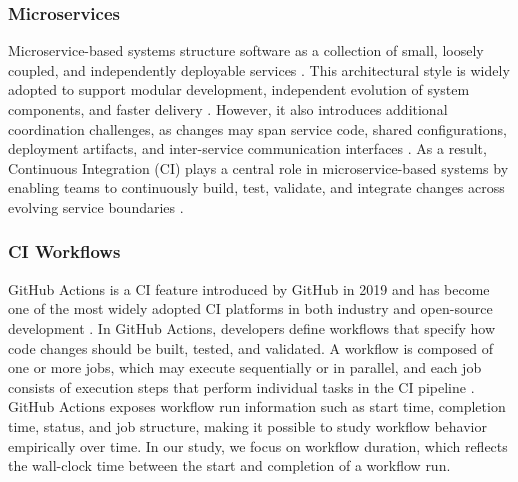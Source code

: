 \documentclass[conference]{IEEEconf}
\begin{document}
\subsubsection{Microservices}
Microservice-based systems structure software as a collection of small, loosely coupled, and independently deployable services \cite{newman2021building,fowler2014microservices}. This architectural style is widely adopted to support modular development, independent evolution of system components, and faster delivery \cite{taibi2019continuous,karabey2021deployment}. However, it also introduces additional coordination challenges, as changes may span service code, shared configurations, deployment artifacts, and inter-service communication interfaces \cite{newman2021building,karabey2021deployment}. As a result, Continuous Integration (CI) plays a central role in microservice-based systems by enabling teams to continuously build, test, validate, and integrate changes across evolving service boundaries \cite{taibi2019continuous}.

\subsubsection{CI Workflows}
GitHub Actions is a CI feature introduced by GitHub in 2019 and has become one of the most widely adopted CI platforms in both industry and open-source development \cite{JetBrains2026CICD}. In GitHub Actions, developers define workflows that specify how code changes should be built, tested, and validated. A workflow is composed of one or more jobs, which may execute sequentially or in parallel, and each job consists of execution steps that perform individual tasks in the CI pipeline \cite{githubactionsdocs}. GitHub Actions exposes workflow run information such as start time, completion time, status, and job structure, making it possible to study workflow behavior empirically over time. In our study, we focus on workflow duration, which reflects the wall-clock time between the start and completion of a workflow run.
\end{document}
